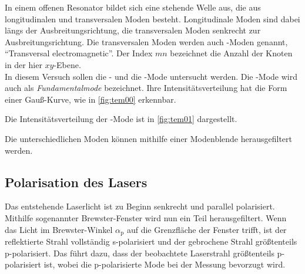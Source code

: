     In einem offenen Resonator bildet sich eine stehende Welle aus,
    die aus longitudinalen und transversalen Moden besteht.
    Longitudinale Moden sind dabei längs der Ausbreitungsrichtung,
    die transversalen Moden senkrecht zur Ausbreitungsrichtung.
    Die transversalen Moden werden auch -Moden genannt,
    \enquote{Transversal electromagnetic}.
    Der Index $mn$ bezeichnet die Anzahl der Knoten in der hier $xy$-Ebene.\\
    In diesem Versuch sollen die - und die -Mode untersucht werden.
    Die -Mode wird auch als \textit{Fundamentalmode} bezeichnet.
    Ihre Intensitätsverteilung hat die Form einer Gauß-Kurve,
    wie in \autoref{fig:tem00} erkennbar.

    Die Intensitätsverteilung der -Mode ist in \autoref{fig:tem01} dargestellt.

    Die unterschiedlichen Moden können mithilfe einer Modenblende herausgefiltert werden.

\subsection{Polarisation des Lasers}

    Das entstehende Laserlicht ist zu Beginn senkrecht und parallel polarisiert.
    Mithilfe sogenannter Brewster-Fenster wird nun ein Teil herausgefiltert.
    Wenn das Licht im Brewster-Winkel $\alpha_\text{p}$ auf die Grenzfläche der Fenster trifft,
    ist der reflektierte Strahl vollständig s-polarisiert und der gebrochene Strahl größtenteils p-polarisiert.
    Das führt dazu,
    dass der beobachtete Laserstrahl größtenteils p-polarisiert ist,
    wobei die p-polarisierte Mode bei der Messung bevorzugt wird.
